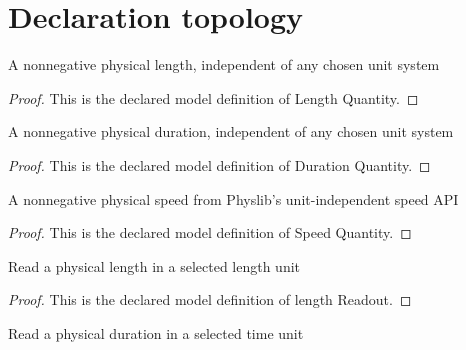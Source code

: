 \section{Declaration topology}
\begin{definition}
  \label{def:physics:phyx-mini-0680:phyxminiproblems-problemphyxmini0680-lengthquantity}
  A nonnegative physical length, independent of any chosen unit system
\end{definition}
\begin{proof}
  This is the declared model definition of Length Quantity.
\end{proof}
\begin{definition}
  \label{def:physics:phyx-mini-0680:phyxminiproblems-problemphyxmini0680-durationquantity}
  A nonnegative physical duration, independent of any chosen unit system
\end{definition}
\begin{proof}
  This is the declared model definition of Duration Quantity.
\end{proof}
\begin{definition}
  \label{def:physics:phyx-mini-0680:phyxminiproblems-problemphyxmini0680-speedquantity}
  A nonnegative physical speed from Physlib's unit-independent speed API
\end{definition}
\begin{proof}
  This is the declared model definition of Speed Quantity.
\end{proof}
\begin{definition}
  \label{def:physics:phyx-mini-0680:phyxminiproblems-problemphyxmini0680-lengthreadout}
  Read a physical length in a selected length unit
\end{definition}
\begin{proof}
  This is the declared model definition of length Readout.
\end{proof}
\begin{definition}
  \label{def:physics:phyx-mini-0680:phyxminiproblems-problemphyxmini0680-durationreadout}
  Read a physical duration in a selected time unit
\end{definition}

